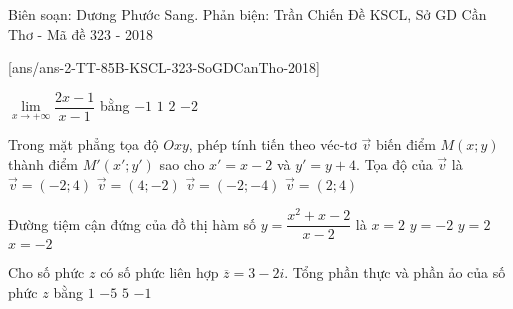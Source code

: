 \begin{name}
	{Biên soạn: Dương Phước Sang. Phản biện: Trần Chiến}
	{Đề KSCL, Sở GD Cần Thơ - Mã đề 323 - 2018}
\end{name}
\setcounter{ex}{0}
[ans/ans-2-TT-85B-KSCL-323-SoGDCanTho-2018]
\begin{ex}%
	$\lim\limits_{x\to +\infty} \dfrac{2x-1}{x-1}$ bằng
	\choice
	{$-1$}
	{$1$}
	{\True $2$}
	{$-2$}
\end{ex}

\begin{ex}%
	Trong mặt phẳng tọa độ $Oxy$, phép tính tiến theo véc-tơ $\overrightarrow{v}$ biến điểm $M(x;y)$ thành điểm $M'(x';y')$ sao cho $x'=x-2$ và $y'=y+4$. Tọa độ của $\overrightarrow{v}$ là
	\choice
	{\True $\overrightarrow{v}=(-2;4)$}
	{$\overrightarrow{v}=(4;-2)$}
	{$\overrightarrow{v}=(-2;-4)$}
	{$\overrightarrow{v}=(2;4)$}
\end{ex}

\begin{ex}%
	Đường tiệm cận đứng của đồ thị hàm số $y=\dfrac{x^2+x-2}{x-2}$ là
	\choice
	{\True $x=2$}
	{$y=-2$}
	{$y=2$}
	{$x=-2$}
\end{ex}

\begin{ex}%
	Cho số phức $z$ có số phức liên hợp $\overline{z}=3-2i$. Tổng phần thực và phần ảo của số phức $z$ bằng
	\choice
	{$1$}
	{$-5$}
	{\True $5$}
	{$-1$}
\end{ex}

